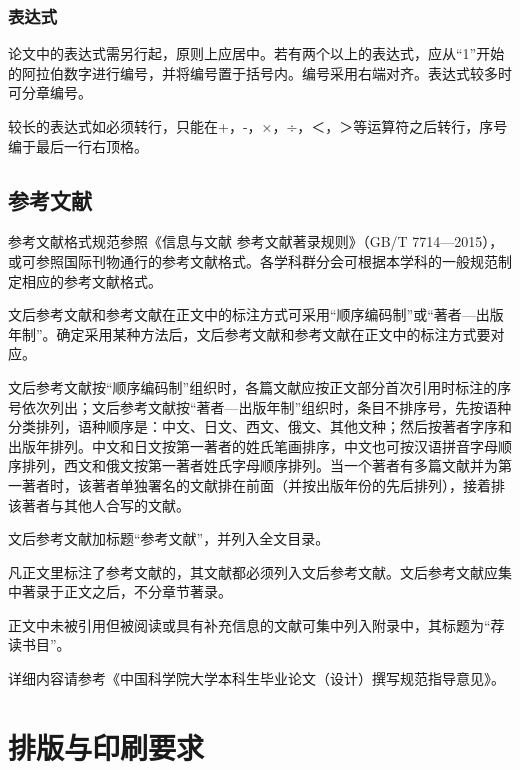 {\subsubsection{表达式}
论文中的表达式需另行起，原则上应居中。若有两个以上的表达式，应从“1”开始的阿拉伯数字进行编号，并将编号置于括号内。编号采用右端对齐。表达式较多时可分章编号。

较长的表达式如必须转行，只能在+，-，×，÷，＜，＞等运算符之后转行，序号编于最后一行右顶格。

\subsection{参考文献}
参考文献格式规范参照《信息与文献 参考文献著录规则》（GB/T 7714—2015），或可参照国际刊物通行的参考文献格式。各学科群分会可根据本学科的一般规范制定相应的参考文献格式。

文后参考文献和参考文献在正文中的标注方式可采用“顺序编码制”或“著者—出版年制”。确定采用某种方法后，文后参考文献和参考文献在正文中的标注方式要对应。

文后参考文献按“顺序编码制”组织时，各篇文献应按正文部分首次引用时标注的序号依次列出；文后参考文献按“著者—出版年制”组织时，条目不排序号，先按语种分类排列，语种顺序是：中文、日文、西文、俄文、其他文种；然后按著者字序和出版年排列。中文和日文按第一著者的姓氏笔画排序，中文也可按汉语拼音字母顺序排列，西文和俄文按第一著者姓氏字母顺序排列。当一个著者有多篇文献并为第一著者时，该著者单独署名的文献排在前面（并按出版年份的先后排列），接着排该著者与其他人合写的文献。

文后参考文献加标题“参考文献”，并列入全文目录。

凡正文里标注了参考文献的，其文献都必须列入文后参考文献。文后参考文献应集中著录于正文之后，不分章节著录。

正文中未被引用但被阅读或具有补充信息的文献可集中列入附录中，其标题为“荐读书目”。

详细内容请参考《中国科学院大学本科生毕业论文（设计）撰写规范指导意见》。

\section{排版与印刷要求}

}
